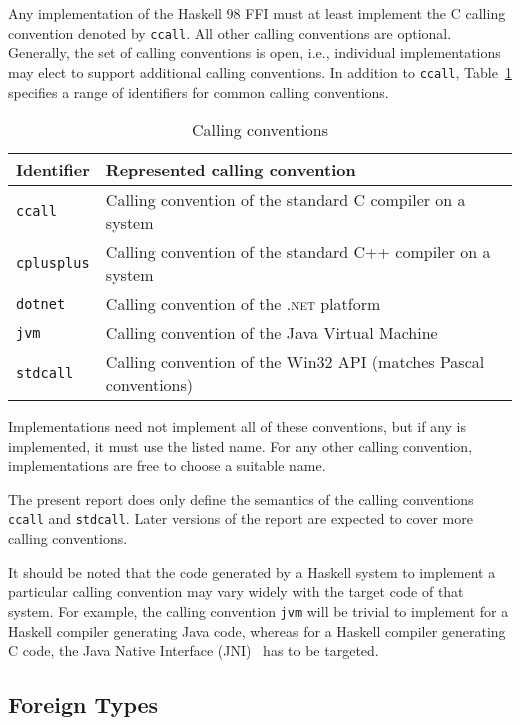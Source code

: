 \documentclass[a4paper,twoside]{article}
\newcommand{\code}[1]{\texttt{#1}}      %
\begin{document}
Any implementation of the Haskell 98 FFI must at least implement the C calling
convention denoted by \code{ccall}.  All other calling conventions are
optional.  Generally, the set of calling conventions is open, i.e., individual
implementations may elect to support additional calling conventions.  In
addition to \code{ccall}, Table~\ref{tab:callconv} specifies a range of
identifiers for common calling conventions.
%
\begin{table}[tbp]
  \begin{center}
    \begin{tabular}{|l|l|}
      \hline
      Identifier & Represented calling convention\\
      \hline\hline
      \code{ccall} 
      & Calling convention of the standard C compiler on a system\\
      \code{cplusplus}
      & Calling convention of the standard C{+}{+} compiler on a system\\
      \code{dotnet}
      & Calling convention of the \textsc{.net} platform\\
      \code{jvm} 
      & Calling convention of the Java Virtual Machine\\
      \code{stdcall}
      & Calling convention of the Win32 API (matches Pascal conventions)\\
      \hline
    \end{tabular}
    \caption{Calling conventions}
    \label{tab:callconv}
  \end{center}
\end{table}
%
Implementations need not implement all of these conventions, but if any is
implemented, it must use the listed name.  For any other calling convention,
implementations are free to choose a suitable name.

The present report does only define the semantics of the calling conventions
\code{ccall} and \code{stdcall}.  Later versions of the report are expected to
cover more calling conventions.

It should be noted that the code generated by a Haskell system to implement a
particular calling convention may vary widely with the target code of that
system.  For example, the calling convention \code{jvm} will be trivial to
implement for a Haskell compiler generating Java code, whereas for a Haskell
compiler generating C code, the Java Native Interface (JNI)~\cite{liang:JNI}
has to be targeted.

\subsection{Foreign Types}
\label{sec:foreign-types}
\end{document}
